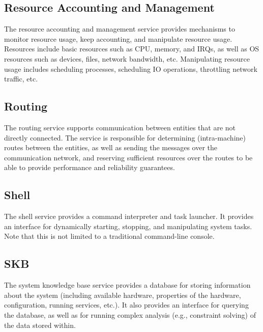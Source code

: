 \documentclass[a4paper,twoside]{report} %
\begin{document}


\subsection{Resource Accounting and Management}


The resource accounting and management service provides mechanisms to
monitor resource usage, keep accounting, and manipulate resource
usage.  Resources include basic resources such as CPU, memory, and IRQs,
as well as OS resources such as devices, files, network bandwidth,
etc. Manipulating resource usage includes scheduling processes,
scheduling IO operations, throttling network traffic, etc. 

\subsection{Routing}


The routing service supports communication between entities that are
not directly connected.  The service is responsible for determining
(intra-machine) routes between the entities, as well as sending the
messages over the communication network, and reserving sufficient
resources over the routes to be able to provide performance and
reliability guarantees.

\subsection{Shell}


The shell service provides a command interpreter and task launcher.
It provides an interface for dynamically starting, stopping, and
manipulating system tasks. Note that this is not limited to a
traditional command-line console.

\subsection{SKB}


The system knowledge base service provides a database for storing
information about the system (including available hardware, properties
of the hardware, configuration, running services, etc.).  It also
provides an interface for querying the database, as well as for
running complex analysis (e.g., constraint solving) of the data stored
within. 
\end{document}

